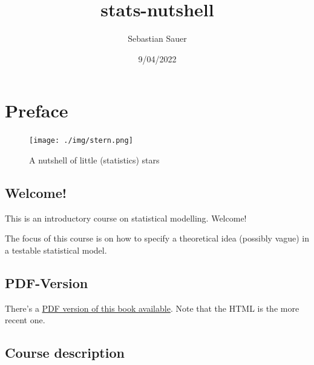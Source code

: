 \documentclass[
  letterpaper,
  DIV=11,
  numbers=noendperiod]{scrreprt}
\title{stats-nutshell}
\author{Sebastian Sauer}
\date{9/04/2022}
\renewcommand*\contentsname{Table of contents}
\newcommand\contentsname{Table of contents}
\theoremstyle{definition}
\theoremstyle{definition}
\theoremstyle{remark}
\begin{document}
\maketitle
\ifdefined\Shaded\renewenvironment{Shaded}{\begin{tcolorbox}[breakable, frame hidden, interior hidden, borderline west={3pt}{0pt}{shadecolor}, enhanced, sharp corners, boxrule=0pt]}{\end{tcolorbox}}\fi

\renewcommand*\contentsname{Table of contents}
{
\hypersetup{linkcolor=}
\setcounter{tocdepth}{2}
\tableofcontents
}

\hypertarget{preface}{%
\chapter*{Preface}\label{preface}}

\begin{figure}

{\centering \texttt{[image: ./img/stern.png]}

}

\caption{A nutshell of little (statistics) stars}

\end{figure}

\hypertarget{welcome}{%
\section*{Welcome!}\label{welcome}}

This is an introductory course on statistical modelling. Welcome!

The focus of this course is on how to specify a theoretical idea
(possibly vague) in a testable statistical model.

\hypertarget{pdf-version}{%
\section*{PDF-Version}\label{pdf-version}}

There's a
\href{https://stats-nutshell.netlify.app/stats-nutshell.pdf}{PDF version
of this book available}. Note that the HTML is the more recent one.

\hypertarget{course-description}{%
\section*{Course description}\label{course-description}}
\end{document}
